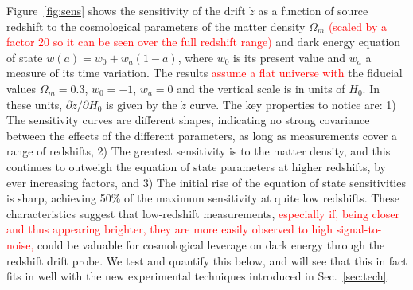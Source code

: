 \documentclass[preprint2, 10pt]{aastex}
\newcommand{\om}{\Omega_m}
\begin{document}
Figure~\ref{fig:sens} shows the sensitivity of the drift $\dot z$ as a 
function of source redshift to the cosmological parameters of the matter 
density $\om$
\textcolor{red}{
(scaled by a factor 20 so it can be seen over the full redshift range)
}
and dark energy equation of state $w(a)=w_0+w_a(1-a)$, where 
$w_0$ is its present value and $w_a$ a measure of its time variation.
The results
\textcolor{red}{assume
a flat universe with}
the fiducial values $\om=0.3$, $w_0=-1$, $w_a=0$ and the 
vertical scale is in units of $H_0$.  In these units, 
$\partial\dot z/\partial H_0$ is 
given by the $\dot z$ curve. The key properties to notice are: 
1) The sensitivity curves are different 
shapes, indicating no strong covariance between the effects of the different 
parameters, as long as measurements cover a range of redshifts, 
2) The greatest sensitivity is to the matter density, and this 
continues to outweigh the equation of state parameters at higher redshifts, 
by ever increasing factors, and 3) The initial rise of the equation of 
state sensitivities is sharp, achieving 50\% of the maximum sensitivity 
at quite low redshifts. These characteristics suggest that low-redshift 
measurements, 
\textcolor{red}
{especially if, being closer and thus appearing brighter, they are more
easily observed to high signal-to-noise,}
could be valuable for cosmological leverage on dark energy 
through the redshift drift probe. We test and quantify this below, and will see that this in fact fits in 
well with the new experimental techniques introduced in Sec.~\ref{sec:tech}. 
\end{document}
